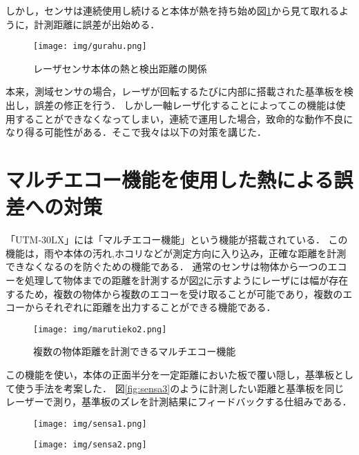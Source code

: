 \documentclass[12pt,oneside]{sotsuken_paper}
\begin{document}
しかし，センサは連続使用し続けると本体が熱を持ち始め図\ref{fig:gurahu}から見て取れるように，計測距離に誤差が出始める．

\begin{figure}[H]
\begin{center}
\texttt{[image: img/gurahu.png]}
\end{center}
\caption{レーザセンサ本体の熱と検出距離の関係}
\label{fig:gurahu}
\end{figure}

本来，測域センサの場合，レーザが回転するたびに内部に搭載された基準板を検出し，誤差の修正を行う．
しかし一軸レーザ化することによってこの機能は使用することができなくなってしまい，連続で運用した場合，致命的な動作不良になり得る可能性がある．そこで我々は以下の対策を講じた．

\section{マルチエコー機能を使用した熱による誤差への対策}
「UTM-30LX」には「マルチエコー機能」という機能が搭載されている．
この機能は，雨や本体の汚れ,ホコリなどが測定方向に入り込み，正確な距離を計測できなくなるのを防ぐための機能である\cite{si2014}．
通常のセンサは物体から一つのエコーを処理して物体までの距離を計測するが図\ref{fig:marutieko2}に示すようにレーザには幅が存在するため，複数の物体から複数のエコーを受け取ることが可能であり，複数のエコーからそれぞれに距離を出力することができる機能である．

\begin{figure}[H]
\begin{center}
\texttt{[image: img/marutieko2.png]}
\end{center}
\caption{複数の物体距離を計測できるマルチエコー機能}
\label{fig:marutieko2}
\end{figure}

この機能を使い，本体の正面半分を一定距離においた板で覆い隠し，基準板として使う手法を考案した．
図\ref{fig:sensa3}のように計測したい距離と基準板を同じレーザーで測り，基準板のズレを計測結果にフィードバックする仕組みである．

\begin{figure}[H]
\begin{center}
\texttt{[image: img/sensa1.png]}
\end{center}
\label{fig:sensa1}
\end{figure}

\begin{figure}[H]
\begin{center}
\texttt{[image: img/sensa2.png]}
\end{center}
\label{fig:sensa2}
\end{figure}
\end{document}
